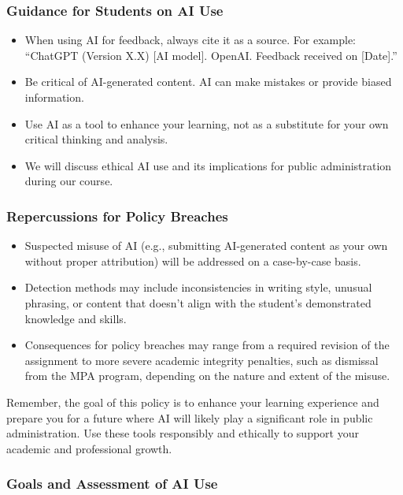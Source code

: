 \documentclass[12pt, letterpaper]{article}
\begin{document}
\subsubsection*{Guidance for Students on AI Use}

\begin{itemize}
    \item When using AI for feedback, always cite it as a source. For example: ``ChatGPT (Version X.X) [AI model]. OpenAI. Feedback received on [Date].''
    \item Be critical of AI-generated content. AI can make mistakes or provide biased information.
    \item Use AI as a tool to enhance your learning, not as a substitute for your own critical thinking and analysis.
    \item We will discuss ethical AI use and its implications for public administration during our course.
\end{itemize}

\subsubsection*{Repercussions for Policy Breaches}

\begin{itemize}
    \item Suspected misuse of AI (e.g., submitting AI-generated content as your own without proper attribution) will be addressed on a case-by-case basis.
    \item Detection methods may include inconsistencies in writing style, unusual phrasing, or content that doesn't align with the student's demonstrated knowledge and skills.
    \item Consequences for policy breaches may range from a required revision of the assignment to more severe academic integrity penalties, such as dismissal from the MPA program, depending on the nature and extent of the misuse.
\end{itemize}

\noindent Remember, the goal of this policy is to enhance your learning experience and prepare you for a future where AI will likely play a significant role in public administration. Use these tools responsibly and ethically to support your academic and professional growth.

\subsubsection*{Goals and Assessment of AI Use}
\end{document}
